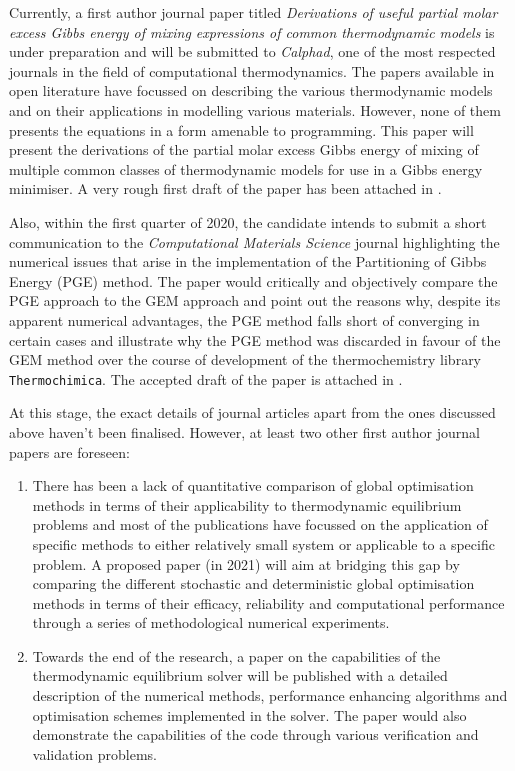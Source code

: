 	Currently, a first author journal paper titled \emph{Derivations of useful partial molar excess Gibbs energy of mixing expressions of common thermodynamic models} is under preparation and will be submitted to  \emph{Calphad}, one of the most respected journals in the field of computational thermodynamics. The papers available in open literature have focussed on describing the various thermodynamic models and on their applications in modelling various materials. However, none of them presents the equations in a form amenable to programming. This paper will present the derivations of the partial molar excess Gibbs energy of mixing of multiple common classes of thermodynamic models for use in a Gibbs energy minimiser. A very rough first draft of the paper has been attached in .
	
	Also, within the first quarter of 2020, the candidate intends to submit a short communication to the \emph{Computational Materials Science} journal highlighting the numerical issues that arise in the implementation of the Partitioning of Gibbs Energy (PGE) method. The paper would critically and objectively compare the PGE approach to the GEM approach and point out the reasons why, despite its apparent numerical advantages, the PGE method falls short of converging in certain cases and illustrate why the PGE method was discarded in favour of the GEM method over the course of development of the thermochemistry library \texttt{Thermochimica}. The accepted draft of the paper is attached in .
	
	At this stage, the exact details of journal articles apart from the ones discussed above haven't been finalised. However, at least two other first author journal papers are foreseen:
	\begin{enumerate}
	\item There has been a lack of quantitative comparison of global optimisation methods in terms of their applicability to thermodynamic equilibrium problems and most of the publications have focussed on the application of specific methods to  either relatively small system or applicable to a specific problem. A proposed paper (in 2021) will aim at bridging this gap by comparing the different stochastic and deterministic global optimisation methods in terms of their efficacy, reliability and computational performance through a series of methodological numerical experiments.
	\item Towards the end of the research, a paper on the capabilities of the thermodynamic equilibrium  solver will be published with a detailed description of the numerical methods, performance enhancing algorithms and optimisation schemes implemented in the solver. The paper would also demonstrate the capabilities of the code through various verification and validation problems.
	\end{enumerate}
	
